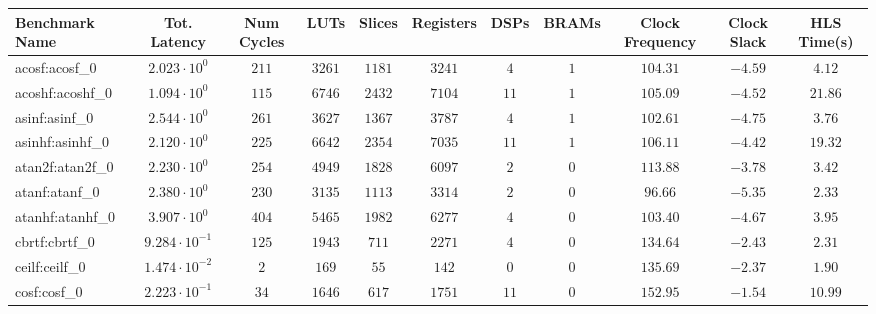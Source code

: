\begin{tabular}{|l|c|c|c|c|c|c|c|c|c|c|}
\hline
Benchmark Name               & Tot. Latency            & Num Cycles & LUTs       & Slices    & Registers  & DSPs    & BRAMs & Clock Frequency & Clock Slack & HLS Time(s) \\
\hline
acosf:acosf\_0               & $ 2.023 \cdot 10^{0}  $ & $ 211    $ & $ 3261   $ & $ 1181  $ & $ 3241   $ & $ 4   $ & $ 1 $ & $ 104.31      $ & $ -4.59   $ & $ 4.12    $ \\
acoshf:acoshf\_0             & $ 1.094 \cdot 10^{0}  $ & $ 115    $ & $ 6746   $ & $ 2432  $ & $ 7104   $ & $ 11  $ & $ 1 $ & $ 105.09      $ & $ -4.52   $ & $ 21.86   $ \\
asinf:asinf\_0               & $ 2.544 \cdot 10^{0}  $ & $ 261    $ & $ 3627   $ & $ 1367  $ & $ 3787   $ & $ 4   $ & $ 1 $ & $ 102.61      $ & $ -4.75   $ & $ 3.76    $ \\
asinhf:asinhf\_0             & $ 2.120 \cdot 10^{0}  $ & $ 225    $ & $ 6642   $ & $ 2354  $ & $ 7035   $ & $ 11  $ & $ 1 $ & $ 106.11      $ & $ -4.42   $ & $ 19.32   $ \\
atan2f:atan2f\_0             & $ 2.230 \cdot 10^{0}  $ & $ 254    $ & $ 4949   $ & $ 1828  $ & $ 6097   $ & $ 2   $ & $ 0 $ & $ 113.88      $ & $ -3.78   $ & $ 3.42    $ \\
atanf:atanf\_0               & $ 2.380 \cdot 10^{0}  $ & $ 230    $ & $ 3135   $ & $ 1113  $ & $ 3314   $ & $ 2   $ & $ 0 $ & $ 96.66       $ & $ -5.35   $ & $ 2.33    $ \\
atanhf:atanhf\_0             & $ 3.907 \cdot 10^{0}  $ & $ 404    $ & $ 5465   $ & $ 1982  $ & $ 6277   $ & $ 4   $ & $ 0 $ & $ 103.40      $ & $ -4.67   $ & $ 3.95    $ \\
cbrtf:cbrtf\_0               & $ 9.284 \cdot 10^{-1} $ & $ 125    $ & $ 1943   $ & $ 711   $ & $ 2271   $ & $ 4   $ & $ 0 $ & $ 134.64      $ & $ -2.43   $ & $ 2.31    $ \\
ceilf:ceilf\_0               & $ 1.474 \cdot 10^{-2} $ & $ 2      $ & $ 169    $ & $ 55    $ & $ 142    $ & $ 0   $ & $ 0 $ & $ 135.69      $ & $ -2.37   $ & $ 1.90    $ \\
cosf:cosf\_0                 & $ 2.223 \cdot 10^{-1} $ & $ 34     $ & $ 1646   $ & $ 617   $ & $ 1751   $ & $ 11  $ & $ 0 $ & $ 152.95      $ & $ -1.54   $ & $ 10.99   $ \\

\end{tabular}
